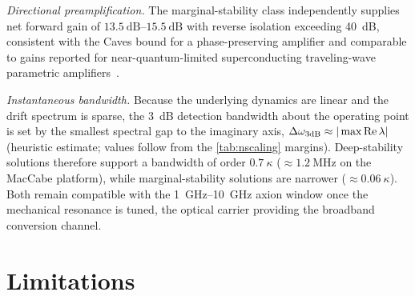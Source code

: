 \documentclass[aps,prxquantum,preprint,superscriptaddress,amsmath,amssymb]{revtex4-2}
\newcommand{\Real}{\operatorname{Re}}
\begin{document}
\textit{Directional preamplification.} The marginal-stability class independently supplies net forward gain of $\qtyrange{13.5}{15.5}{\dB}$ with reverse isolation exceeding \qty{40}{\dB}, consistent with the Caves bound for a phase-preserving amplifier and comparable to gains reported for near-quantum-limited superconducting traveling-wave parametric amplifiers~\citep{Macklin2015}.

\textit{Instantaneous bandwidth.} Because the underlying dynamics are linear and the drift spectrum is sparse, the \qty{3}{\dB} detection bandwidth about the operating point is set by the smallest spectral gap to the imaginary axis, $\Delta\omega_{\rm 3dB}\approx|\max\Real\lambda|$ (heuristic estimate; values follow from the \cref{tab:nscaling} margins). Deep-stability solutions therefore support a bandwidth of order $\qty{0.7}{\kappa}$ ($\approx\qty{1.2}{\mega\hertz}$ on the MacCabe platform), while marginal-stability solutions are narrower ($\approx\qty{0.06}{\kappa}$). Both remain compatible with the \qtyrange{1}{10}{\giga\hertz} axion window once the mechanical resonance is tuned, the optical carrier providing the broadband conversion channel.

\section{Limitations}
\label{sec:limitations}
\end{document}
